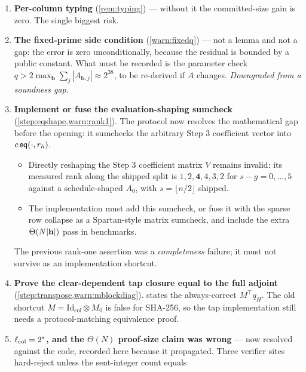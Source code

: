 \begin{enumerate}[leftmargin=1.5em,itemsep=2pt,topsep=4pt]
  \item \textbf{Per-column typing} (\cref{rem:typing}) --- without it the
        committed-size gain is zero. The single biggest risk.
  \item \textbf{The fixed-prime side condition} (\cref{warn:fixedq}) --- not a
        lemma and not a gap: the error is zero unconditionally, because the
        residual is bounded by a public constant. What must be recorded is the
        parameter check $q>2\max_{\mathbf b}\sum_j|A_{\mathbf b,j}|\approx2^{38}$,
        to be re-derived if $A$ changes. \emph{Downgraded from a soundness gap.}
  \item \textbf{Implement or fuse the evaluation-shaping sumcheck}
        (\cref{step:eqshape,warn:rank1}).
        The protocol now resolves the mathematical gap before the opening:
        it sumchecks the arbitrary Step 3 coefficient vector into
        $c\,\mathsf{eq}(\cdot,r_h)$.
        \begin{itemize}[leftmargin=1.2em,itemsep=1pt,topsep=2pt]
          \item Directly reshaping the Step 3 coefficient matrix $V$ remains
                invalid: its measured rank along the shipped split is
                $1,2,\mathbf 4,4,3,2$ for $s-g=0,\dots,5$ against a
                schedule-shaped $A_0$, with $s=\lfloor n/2\rfloor$ shipped.
          \item The implementation must add this sumcheck, or fuse it with the
                sparse row collapse as a Spartan-style matrix sumcheck, and
                include the extra $\Theta(N|\mathbf{h}|)$ pass in benchmarks.
        \end{itemize}
        The previous rank-one assertion was a \emph{completeness} failure; it
        must not survive as an implementation shortcut.
  \item \textbf{Prove the clear-dependent tap closure equal to the full
        adjoint} (\cref{step:transpose,warn:mblockdiag}).
         states the always-correct
        $M^{\!\top}q_H$.  The old shortcut
        $M=\mathrm{Id}_{\text{col}}\otimes M_0$ is false for SHA-256, so the tap
        implementation still needs a protocol-matching equivalence proof.
  \item \textbf{$\ell_{\mathrm{col}}=2^{s}$, and the $\Theta(N)$ proof-size claim was wrong}
        --- now resolved against the code, recorded here because it propagated.
        Three verifier sites hard-reject unless the sent-integer count equals

\end{enumerate}

